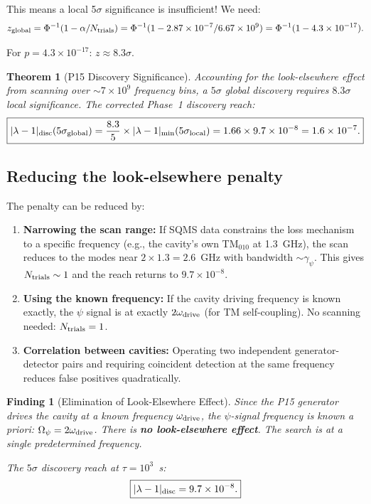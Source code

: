 \documentclass[11pt]{article}
\newtheorem{theorem}{Theorem}
\newtheorem{finding}{Finding}
\newcommand{\ee}[1]{\times 10^{#1}}
\newcommand{\Opsi}{\Omega_\psi}
\newcommand{\gpsi}{\gamma_\psi}
\newcommand{\lam}{\lambda}
\begin{document}
This means a local 5$\sigma$ significance is insufficient! We need:
\begin{equation}
z_{\rm global} = \Phi^{-1}(1 - \alpha/N_{\rm trials})
= \Phi^{-1}(1 - 2.87\ee{-7}/6.67\ee{9})
= \Phi^{-1}(1 - 4.3\ee{-17}).
\end{equation}

For $p = 4.3\ee{-17}$: $z \approx 8.3\sigma$.

\begin{theorem}[P15 Discovery Significance]
\label{thm:discovery}
Accounting for the look-elsewhere effect from scanning over
$\sim 7\ee{9}$ frequency bins, a $5\sigma$ global discovery
requires $8.3\sigma$ local significance. The corrected
Phase~1 discovery reach:
\begin{equation}
\boxed{|\lam-1|_{\rm disc}(5\sigma_{\rm global})
= \frac{8.3}{5} \times |\lam-1|_{\rm min}(5\sigma_{\rm local})
= 1.66 \times 9.7\ee{-8} = 1.6\ee{-7}.}
\end{equation}
\end{theorem}

\subsection{Reducing the look-elsewhere penalty}

The penalty can be reduced by:
\begin{enumerate}
\item \textbf{Narrowing the scan range:} If SQMS data constrains
the loss mechanism to a specific frequency (e.g., the cavity's
own TM$_{010}$ at 1.3~GHz), the scan reduces to the modes near
$2 \times 1.3 = 2.6$~GHz with bandwidth $\sim \gpsi$. This gives
$N_{\rm trials} \sim 1$ and the reach returns to $9.7\ee{-8}$.

\item \textbf{Using the known frequency:} If the cavity driving
frequency is known exactly, the $\psi$ signal is at exactly
$2\omega_{\rm drive}$ (for TM self-coupling). No scanning needed:
$N_{\rm trials} = 1$.

\item \textbf{Correlation between cavities:} Operating two
independent generator-detector pairs and requiring coincident
detection at the same frequency reduces false positives quadratically.
\end{enumerate}

\begin{finding}[Elimination of Look-Elsewhere Effect]
\label{find:look-elsewhere}
Since the P15 generator drives the cavity at a \emph{known}
frequency $\omega_{\rm drive}$, the $\psi$-signal frequency is
known a priori: $\Opsi = 2\omega_{\rm drive}$. There is
\textbf{no look-elsewhere effect}. The search is at a single
predetermined frequency.

The $5\sigma$ discovery reach at $\tau = 10^3$~s:
\begin{equation}
\boxed{|\lam-1|_{\rm disc} = 9.7\ee{-8}.}
\end{equation}
\end{finding}
\end{document}
